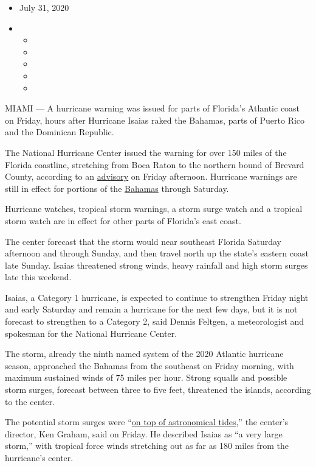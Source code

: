 \begin{itemize}
\item
  July 31, 2020
\item
  \begin{itemize}
  \item
  \item
  \item
  \item
  \item
  \end{itemize}
\end{itemize}

MIAMI --- A hurricane warning was issued for parts of Florida's Atlantic
coast on Friday, hours after Hurricane Isaias raked the Bahamas, parts
of Puerto Rico and the Dominican Republic.

The National Hurricane Center issued the warning for over 150 miles of
the Florida coastline, stretching from Boca Raton to the northern bound
of Brevard County, according to an
\href{https://www.nhc.noaa.gov/text/refresh/MIATCPAT4+shtml/312049.shtml}{advisory}
on Friday afternoon. Hurricane warnings are still in effect for portions
of the
\href{https://www.nhc.noaa.gov/graphics_at4.shtml?start\#contents}{Bahamas}
through Saturday.

Hurricane watches, tropical storm warnings, a storm surge watch and a
tropical storm watch are in effect for other parts of Florida's east
coast.

The center forecast that the storm would near southeast Florida Saturday
afternoon and through Sunday, and then travel north up the state's
eastern coast late Sunday. Isaias threatened strong winds, heavy
rainfall and high storm surges late this weekend.

Isaias, a Category 1 hurricane, is expected to continue to strengthen
Friday night and early Saturday and remain a hurricane for the next few
days, but it is not forecast to strengthen to a Category 2, said Dennis
Feltgen, a meteorologist and spokesman for the National Hurricane
Center.

The storm, already the ninth named system of the 2020 Atlantic hurricane
season, approached the Bahamas from the southeast on Friday morning,
with maximum sustained winds of 75 miles per hour. Strong squalls and
possible storm surges, forecast between three to five feet, threatened
the islands, according to the center.

The potential storm surges were
``\href{https://twitter.com/NWS/status/1289189099836977152}{on top of
astronomical tides},'' the center's director, Ken Graham, said on
Friday. He described Isaias as ``a very large storm,'' with tropical
force winds stretching out as far as 180 miles from the hurricane's
center.

